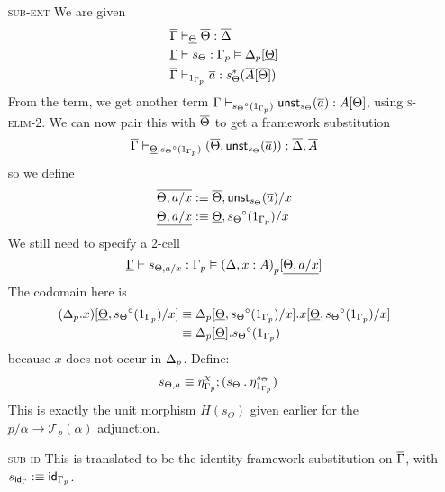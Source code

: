 \documentclass[10pt]{article}
\theoremstyle{definition}
\newcommand{\yields}{\vdash}
\newcommand\UnSt[2]{\ensuremath{\mathsf{unst}_{#1}(#2)}}
\newcommand\TrCirc[2]{\ensuremath{{#1}^\circ(#2)}}
\newcommand{\id}{\mathsf{id}}
\newcommand\El[2]{\mathcal{T}_{#1}(#2)}
\newcommand\bdot[0]{\mathbin{.}}
\begin{document}
\begin{enumerate}
\item[\textsc{sub-ext}] We are given
\begin{align*}
\upstairs{\Gamma} &\yields_{\downstairs{\Theta}} \upstairs{\Theta} : \upstairs{\Delta} \\
\downstairs{\Gamma} &\yields s_\Theta : \asdep{\Gamma} \vDash \asdep{\Delta}[\downstairs{\Theta}] \\
\upstairs{\Gamma} &\yields_{1_{\asdep{\Gamma}}} \upstairs{a} : s_{\Theta}^*(\upstairs{A}[\upstairs{\Theta}])
\end{align*}
From the term, we get another term $\upstairs{\Gamma}\yields_{\TrCirc{s_{\Theta}}{1_{\asdep{\Gamma}}}} \UnSt{s_\Theta}{\upstairs{a}} : \upstairs{A}[\upstairs{\Theta}]$, using \textsc{s-elim-2}. We can now pair this with $\overline{\Theta}$ to get a framework substitution \[\upstairs{\Gamma} \yields_{\downstairs{\Theta}, \TrCirc{s_{\Theta}}{1_{\asdep{\Gamma}}}} (\upstairs{\Theta}, \UnSt{s_\Theta}{\upstairs{a}}) : \upstairs{\Delta}, \upstairs{A}\]
so we define
\begin{align*}
\upstairs{\Theta, a/x} &:\equiv \upstairs{\Theta}, \UnSt{s_\Theta}{\upstairs{a}}/x \\
\downstairs{\Theta, a/x} &:\equiv \downstairs{\Theta}, \TrCirc{s_{\Theta}}{1_{\asdep{\Gamma}}}/x
\end{align*}
We still need to specify a 2-cell 
\[
\downstairs{\Gamma} \yields s_{\Theta, a/x} : \asdep{\Gamma} \vDash \asdep{(\Delta, x : A)}[\downstairs{\Theta, a/x}]
\]
The codomain here is
\begin{align*}
(\asdep{\Delta}.x)[\downstairs{\Theta}, \TrCirc{s_{\Theta}}{1_{\asdep{\Gamma}}}/x] 
&\equiv \asdep{\Delta}[\downstairs{\Theta}, \TrCirc{s_{\Theta}}{1_{\asdep{\Gamma}}}/x].x[\downstairs{\Theta}, \TrCirc{s_{\Theta}}{1_{\asdep{\Gamma}}}/x] \\
&\equiv \asdep{\Delta}[\downstairs{\Theta}].\TrCirc{s_{\Theta}}{1_{\asdep{\Gamma}}}
\end{align*}
because $x$ does not occur in ${\Delta}_p$. Define:
\begin{align*}
s_{\Theta, a} &\equiv \eta^\chi_{\asdep{\Gamma}}; (s_\Theta \bdot \eta_{1_{\asdep{\Gamma}}}^{s_\Theta})
\end{align*}
This is exactly the unit morphism $H(s_\Theta)$ given earlier for the $p/\alpha \to \El{p}{\alpha}$ adjunction.

\item[\textsc{sub-id}] This is translated to be the identity framework substitution on $\overline{\Gamma}$, with $s_{\id_\Gamma} :\equiv \id_{\asdep{\Gamma}}$.


\end{enumerate}
\end{document}
